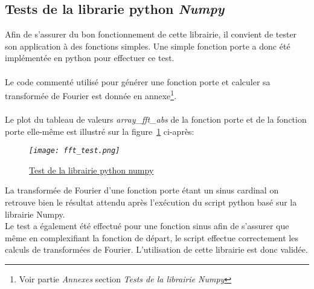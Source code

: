\documentclass[12pt,fleqn]{book} %
\begin{document}
\subsection{Tests de la librarie python \emph{Numpy}}
Afin de s'assurer du bon fonctionnement de cette librairie, il convient de tester son application à des fonctions simples. Une simple fonction porte a donc été implémentée en python pour effectuer ce test.
~\\\\Le code commenté utilisé pour générer une fonction porte et calculer sa transformée de Fourier est donnée en annexe\footnote{Voir partie \emph{Annexes} section \emph{Tests de la librairie Numpy}}.
~\\\\Le plot du tableau de valeurs \emph{array\_fft\_abs} de la fonction porte et de la fonction porte elle-même est illustré sur la figure~\underline{\color{blue}\ref{fft_test}} ci-après:
\begin{figure}[H]
	\centering
	\itshape
	\texttt{[image: fft\_test.png]}
	\caption{\label{fft_test} \underline{Test de la librairie python numpy}}
\end{figure}
La transformée de Fourier d'une fonction porte étant un sinus cardinal on retrouve bien le résultat attendu après l'exécution du script python basé sur la librairie Numpy.
~\\Le test a également été effectué pour une fonction sinus afin de s'assurer que même en complexifiant la fonction de départ, le script effectue correctement les calculs de transformées de Fourier. L'utilisation de cette librairie est donc validée.
\end{document}
